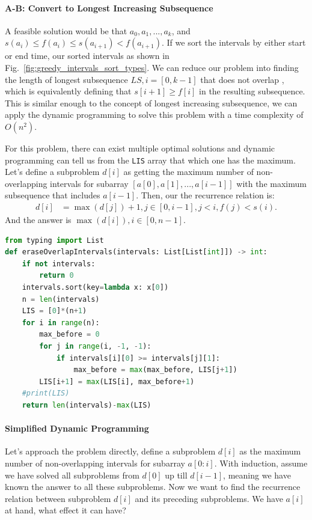\documentclass[../main.tex]{subfiles}
\begin{document}
\paragraph{A-B: Convert to Longest Increasing Subsequence}   A feasible solution would be that $a_0, a_1, ..., a_k$, and $s(a_i)\leq f(a_i)\leq s(a_{i+1}) < f(a_{i+1})$. If we sort the intervals by either start or end time, our sorted intervals as shown in Fig.~\ref{fig:greedy_intervals_sort_types}. We can reduce our problem  into finding the length of longest subsequence $LS, i = [0, k-1]$ that does not overlap , which is equivalently defining  that $s[i+1]\geq f[i]$ in the resulting subsequence. This is similar enough to the concept of longest increasing subsequence, we can apply the dynamic programming to solve this problem with a time complexity of $O(n^2)$. 

For this problem, there can exist multiple optimal solutions and dynamic programming can tell us from the \texttt{LIS} array that which one has the maximum. Let's define a subproblem $d[i]$ as getting the maximum number of non-overlapping intervals for subarray $[a[0], a[1], ..., a[i-1]]$ with the maximum subsequence that includes $a[i-1]$. Then, our the recurrence relation is:
\begin{align}
    d[i]&=\max(d[j])+1, j \in [0, i-1], j <i, f(j) < s(i).
\end{align}
And the answer is $\max(d[i]), i \in[0, n-1]$.
\begin{lstlisting}[language=Python]
from typing import List 
def eraseOverlapIntervals(intervals: List[List[int]]) -> int:
    if not intervals:
        return 0
    intervals.sort(key=lambda x: x[0])
    n = len(intervals)
    LIS = [0]*(n+1) 
    for i in range(n): 
        max_before = 0
        for j in range(i, -1, -1): 
            if intervals[i][0] >= intervals[j][1]:
                max_before = max(max_before, LIS[j+1])
        LIS[i+1] = max(LIS[i], max_before+1)
    #print(LIS)
    return len(intervals)-max(LIS)
\end{lstlisting}

\paragraph{Simplified Dynamic Programming}
Let's approach the problem directly, define a subproblem $d[i]$ as the maximum number of non-overlapping intervals for subarray $a[0:i]$. 
With induction, assume we have solved all subproblems from $d[0]$ up till $d[i-1]$, meaning we have known the answer to all these subproblems.  Now we want to find the recurrence relation between subproblem $d[i]$ and its preceding subproblems. We have $a[i]$ at hand, what effect it can have? 
\end{document}
